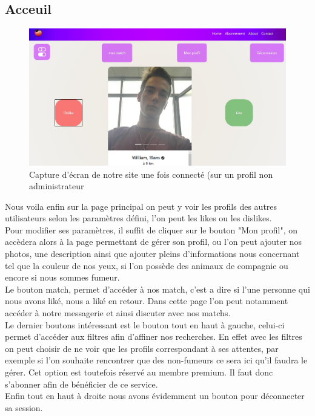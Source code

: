 \documentclass[12pt]{report}
\begin{document}
\subsection{Acceuil}
\begin{figure}[h!]
	\begin{center}
		\includegraphics[scale=0.5]{principal.jpg}
	\end{center}
		\caption{Capture d'écran de notre site une fois connecté (sur un profil non administrateur}
\end{figure}
Nous voila enfin sur la page principal on peut y voir les profils des autres utilisateurs selon les paramètres défini, l'on peut les likes ou les dislikes.\\
 Pour modifier ses paramètres, il suffit de cliquer sur le bouton "Mon profil", on accèdera alors à la page permettant de gérer son profil, ou l'on peut ajouter nos photos, une description ainsi que ajouter pleins d'informations nous concernant tel que la couleur de nos yeux, si l'on possède des animaux de compagnie ou encore si nous sommes fumeur.\\
Le bouton match, permet d'accéder à nos match, c'est a dire si l'une personne qui nous avons liké, nous a liké en retour. Dans cette page l'on peut notamment accéder à notre messagerie et ainsi discuter avec nos matchs.
\\
Le dernier boutons intéressant est le bouton tout en haut à gauche, celui-ci permet d'accéder aux filtres afin d'affiner nos recherches. En effet avec les filtres on peut choisir de ne voir que les profils correspondant à ses attentes, par exemple si l'on souhaite rencontrer que des non-fumeurs ce sera ici qu'il faudra le gérer. Cet option est toutefois réservé au membre premium. Il faut donc s'abonner afin de bénéficier de ce service.\\
Enfin tout en haut à droite nous avons évidemment un bouton pour déconnecter sa session.
\clearpage
\end{document}
